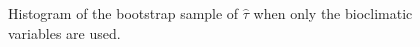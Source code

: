 \begin{figure}
\caption{\label{fig:BootstapBio}Histogram of the bootstrap sample of $\hat{\tau}$ when only the bioclimatic variables are used.}
\end{figure}


